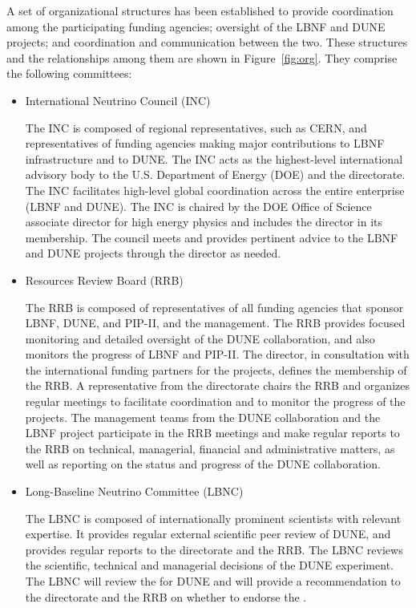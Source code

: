 A set  of  organizational structures  has been established  to  provide
coordination  among  the  participating  funding agencies;
oversight of the LBNF and DUNE projects;
and coordination and communication between the 
two. These structures and the relationships among them are shown 
in Figure~\ref{fig:org}. They comprise the following committees:
\begin{itemize}
\item International Neutrino Council (INC)

The INC is composed of regional representatives, such as CERN, and representatives of funding agencies making major contributions to LBNF infrastructure and to DUNE. The INC acts as the highest-level international advisory body to the U.S. Department of Energy (DOE) and the \fnal directorate. The INC facilitates high-level global coordination across the entire enterprise (LBNF and DUNE). The INC is chaired by the DOE Office of Science associate director for high energy physics and includes the \fnal director in its membership. The council meets and provides pertinent advice to the LBNF and DUNE projects through the \fnal director as needed.
\item Resources Review Board (RRB)

The RRB is composed of representatives of all funding agencies that sponsor LBNF, DUNE, and PIP-II, and the \fnal management. The RRB provides focused monitoring and detailed oversight of the DUNE collaboration, and also monitors the progress of LBNF and PIP-II. The \fnal director,  in consultation with the international funding partners for the projects, defines the membership of the RRB. A representative from the \fnal directorate chairs the RRB and organizes regular meetings to facilitate coordination and to monitor the progress of the projects. The management teams from the DUNE collaboration and the LBNF project participate in the RRB meetings and make regular reports to the RRB on technical, managerial, financial and administrative matters, as well as reporting on the status and progress of the DUNE collaboration.

\item Long-Baseline Neutrino Committee (LBNC)

The LBNC is composed of internationally prominent scientists with relevant expertise. It provides regular external scientific peer review of DUNE, and provides regular reports to the \fnal  directorate and the RRB. The LBNC reviews the scientific, technical and managerial decisions of the DUNE experiment. The LBNC will review the  for DUNE and will provide a recommendation to the \fnal directorate and the RRB on whether to endorse the .


\end{itemize}
